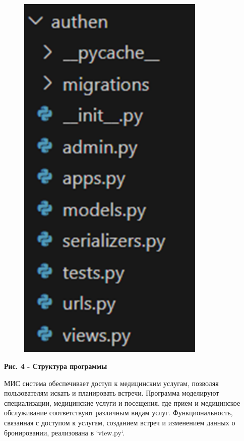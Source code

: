 \begin{figure}[H]
	\centering
	\includegraphics[width=0.8\textwidth]{assets/154}
	\caption*{}
\end{figure}

{\bfseries Рис. 4 - Структура программы}

МИС система обеспечивает доступ к медицинским услугам, позволяя
пользователям искать и планировать встречи. Программа моделируют
специализации, медицинские услуги и посещения, где прием и медицинское
обслуживание соответствуют различным видам услуг. Функциональность,
связанная с доступом к услугам, созданием встреч и изменением данных о
бронировании, реализована в `view.py`.

